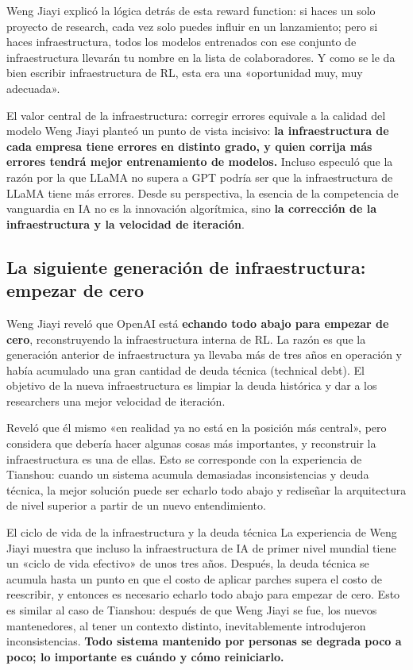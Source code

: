 \documentclass[a4paper]{article}
\begin{document}
Weng Jiayi explicó la lógica detrás de esta reward function: si haces un solo proyecto de research, cada vez solo puedes influir en un lanzamiento; pero si haces infraestructura, todos los modelos entrenados con ese conjunto de infraestructura llevarán tu nombre en la lista de colaboradores. Y como se le da bien escribir infraestructura de RL, esta era una «oportunidad muy, muy adecuada».

\begin{importantbox}{El valor central de la infraestructura: corregir errores equivale a la calidad del modelo}
Weng Jiayi planteó un punto de vista incisivo: \textbf{la infraestructura de cada empresa tiene errores en distinto grado, y quien corrija más errores tendrá mejor entrenamiento de modelos.} Incluso especuló que la razón por la que LLaMA no supera a GPT podría ser que la infraestructura de LLaMA tiene más errores. Desde su perspectiva, la esencia de la competencia de vanguardia en IA no es la innovación algorítmica, sino \textbf{la corrección de la infraestructura y la velocidad de iteración}.
\end{importantbox}

\subsection{La siguiente generación de infraestructura: empezar de cero}

Weng Jiayi reveló que OpenAI está \textbf{echando todo abajo para empezar de cero}, reconstruyendo la infraestructura interna de RL. La razón es que la generación anterior de infraestructura ya llevaba más de tres años en operación y había acumulado una gran cantidad de deuda técnica (technical debt). El objetivo de la nueva infraestructura es limpiar la deuda histórica y dar a los researchers una mejor velocidad de iteración.

Reveló que él mismo «en realidad ya no está en la posición más central», pero considera que debería hacer algunas cosas más importantes, y reconstruir la infraestructura es una de ellas. Esto se corresponde con la experiencia de Tianshou: cuando un sistema acumula demasiadas inconsistencias y deuda técnica, la mejor solución puede ser echarlo todo abajo y rediseñar la arquitectura de nivel superior a partir de un nuevo entendimiento.

\begin{warningbox}{El ciclo de vida de la infraestructura y la deuda técnica}
La experiencia de Weng Jiayi muestra que incluso la infraestructura de IA de primer nivel mundial tiene un «ciclo de vida efectivo» de unos tres años. Después, la deuda técnica se acumula hasta un punto en que el costo de aplicar parches supera el costo de reescribir, y entonces es necesario echarlo todo abajo para empezar de cero. Esto es similar al caso de Tianshou: después de que Weng Jiayi se fue, los nuevos mantenedores, al tener un contexto distinto, inevitablemente introdujeron inconsistencias. \textbf{Todo sistema mantenido por personas se degrada poco a poco; lo importante es cuándo y cómo reiniciarlo.}
\end{warningbox}
\end{document}
